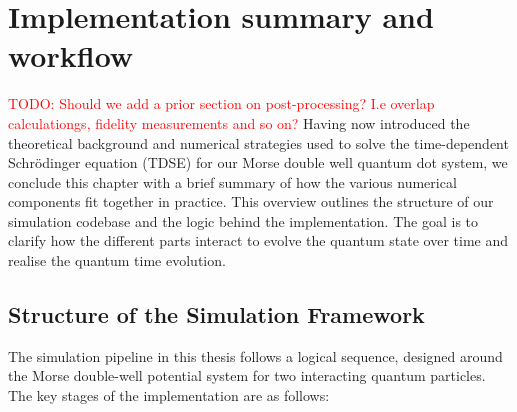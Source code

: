 \documentclass{subfiles}
\begin{document}
\section{Implementation summary and workflow}\label{sec:summary_workflow}
\textcolor{red}{TODO: Should we add a prior section on post-processing? I.e overlap calculationgs, fidelity measurements and so on?}
Having now introduced the theoretical background and numerical strategies used to solve the time-dependent Schrödinger equation (TDSE) for our Morse double well quantum dot system, we conclude this chapter with a brief summary of how the various numerical components fit together in practice. This overview outlines the structure of our simulation codebase and the logic behind the implementation. The goal is to clarify how the different parts interact to evolve the quantum state over time and realise the quantum time evolution. 
\subsection*{Structure of the Simulation Framework}

The simulation pipeline in this thesis follows a logical sequence, designed around the Morse double-well potential system for two interacting quantum particles. The key stages of the implementation are as follows:
\end{document}
